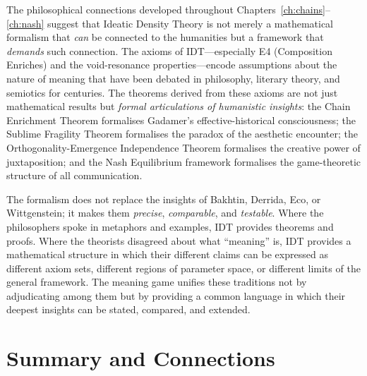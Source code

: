 \begin{remark}
\label{rem:ch14:open_questions_philosophy}
The philosophical connections developed throughout Chapters~\ref{ch:chains}--\ref{ch:nash}
suggest that Ideatic Density Theory is not merely a mathematical formalism
that \emph{can} be connected to the humanities but a framework that
\emph{demands} such connection.  The axioms of IDT---especially E4
(Composition Enriches) and the void-resonance properties---encode assumptions
about the nature of meaning that have been debated in philosophy, literary
theory, and semiotics for centuries.  The theorems derived from these axioms
are not just mathematical results but \emph{formal articulations of humanistic
insights}: the Chain Enrichment Theorem formalises Gadamer's effective-historical
consciousness; the Sublime Fragility Theorem formalises the paradox of the
aesthetic encounter; the Orthogonality-Emergence Independence Theorem
formalises the creative power of juxtaposition; and the Nash Equilibrium
framework formalises the game-theoretic structure of all communication.

The formalism does not replace the insights of Bakhtin, Derrida, Eco, or
Wittgenstein; it makes them \emph{precise}, \emph{comparable}, and
\emph{testable}.  Where the philosophers spoke in metaphors and examples, IDT
provides theorems and proofs.  Where the theorists disagreed about what
``meaning'' is, IDT provides a mathematical structure in which their
different claims can be expressed as different axiom sets, different regions of
parameter space, or different limits of the general framework.  The meaning
game unifies these traditions not by adjudicating among them but by providing
a common language in which their deepest insights can be stated, compared,
and extended.
\end{remark}



\section{Summary and Connections}

